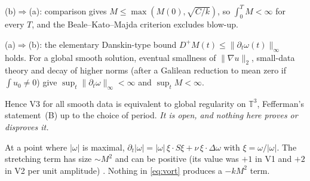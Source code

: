 \documentclass[11pt]{article}
\newcommand{\T}{\mathbb{T}^3}
\theoremstyle{remark}
\begin{document}
(b)$\Rightarrow$(a): comparison gives $M\le\max(M(0),\sqrt{C/k})$, so $\int_0^TM<\infty$ for every $T$, and the
Beale--Kato--Majda criterion \cite{BKM1984} excludes blow-up.

(a)$\Rightarrow$(b): the elementary Danskin-type bound $D^+M(t)\le\|\partial_t\omega(t)\|_\infty$ holds. For a global
smooth solution, eventual smallness of $\|\nabla u\|_2$, small-data theory and decay of higher norms
\cite{RRS2016,FoiasTemam1989} (after a Galilean reduction to mean zero if $\int u_0\ne0$) give $\sup_t\|\partial_t\omega\|_\infty<\infty$ and $\sup_tM<\infty$.

Hence V3 for all smooth data is equivalent to global regularity on $\T$, Fefferman's statement~(B) \cite{Fefferman}
up to the choice of period. \emph{It is open, and nothing here proves or disproves it.}

At a point where $|\omega|$ is maximal, $\partial_t|\omega|=|\omega|\,\xi\cdot S\xi+\nu\,\xi\cdot\Delta\omega$ with
$\xi=\omega/|\omega|$. The stretching term has size $\sim M^2$ and can be positive (its value was $+1$ in V1 and $+2$ in V2
per unit amplitude) \cite{MajdaBertozzi2002}. Nothing in \eqref{eq:vort} produces a $-kM^2$ term.
\end{document}
